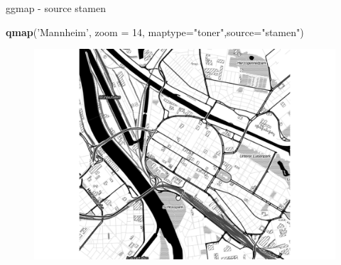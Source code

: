\documentclass[ignorenonframetext,]{beamer}
\newenvironment{Shaded}{}{}
\newcommand{\KeywordTok}[1]{\textcolor[rgb]{0.00,0.44,0.13}{\textbf{{#1}}}}
\newcommand{\DataTypeTok}[1]{\textcolor[rgb]{0.56,0.13,0.00}{{#1}}}
\newcommand{\DecValTok}[1]{\textcolor[rgb]{0.25,0.63,0.44}{{#1}}}
\newcommand{\StringTok}[1]{\textcolor[rgb]{0.25,0.44,0.63}{{#1}}}
\newcommand{\NormalTok}[1]{{#1}}
\begin{document}
\begin{frame}[fragile]{ggmap - source stamen}

\begin{Shaded}
\begin{Highlighting}[]
\KeywordTok{qmap}\NormalTok{(}\StringTok{'Mannheim'}\NormalTok{, }\DataTypeTok{zoom =} \DecValTok{14}\NormalTok{,}
 \DataTypeTok{maptype=}\StringTok{"toner"}\NormalTok{,}\DataTypeTok{source=}\StringTok{"stamen"}\NormalTok{)}
\end{Highlighting}
\end{Shaded}

\begin{figure}[htbp]
\centering
\includegraphics{RSocialScience2_files/figure-beamer/unnamed-chunk-42-1.pdf}
\caption{}
\end{figure}

\end{frame}
\end{document}
